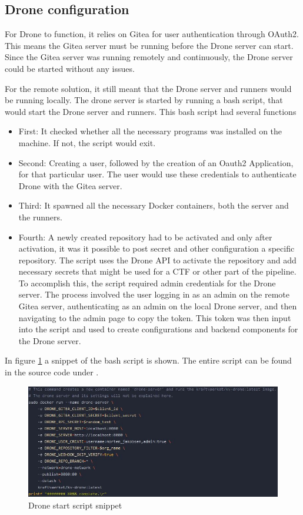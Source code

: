 \subsection{Drone configuration}
For Drone to function, it relies on Gitea for user authentication through OAuth2. 
This means the Gitea server must be running before the Drone server can start. 
Since the Gitea server was running remotely and continuously, the Drone server could be started without any issues.

For the remote solution, it still meant that the Drone server and runners would be running locally.
The drone server is started by running a bash script, that would start the Drone server and runners.
This bash script had several functions
\begin{itemize}
    \item First:
    It checked whether all the necessary programs was installed on the machine. If not, the script would exit.
    \item Second:
    Creating a user, followed by the creation of an Oauth2 Application, for that particular user.
    The user would use these credentials to authenticate Drone with the Gitea server.
    \item Third:
    It spawned all the necessary Docker containers, both the server and the runners.
    \item Fourth:
    A newly created repository had to be activated and only after activation, it 
    was it possible to post secret and other configuration a specific repository.
    The script uses the Drone \ac{API} to activate the repository and add necessary secrets that might be used for a CTF or 
    other part of the pipeline.
    To accomplish this, the script required admin credentials for the Drone server. 
    The process involved the user logging in as an admin on the remote Gitea server, 
    authenticating as an admin on the local Drone server, and then navigating to the admin page to copy the token. 
    This token was then input into the script and used to create configurations and backend components for the Drone server.
\end{itemize}
In figure \ref{sec:pipeline_remote_drone_start_script} a snippet of the bash script is shown.
The entire script can be found in the source code under .

\begin{figure}[h]
    \centering
    \includegraphics[scale=.69]{images/remote-script-drone.jpg}
    \caption{Drone start script snippet}
    \label{sec:pipeline_remote_drone_start_script}
\end{figure}

